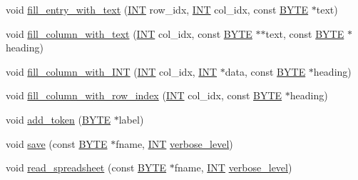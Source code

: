 \begin{DoxyCompactItemize}
\item 
void \mbox{\hyperlink{classspreadsheet_a566b10f622f02ea407a41f00942d9d03}{fill\+\_\+entry\+\_\+with\+\_\+text}} (\mbox{\hyperlink{galois_8h_a09fddde158a3a20bd2dcadb609de11dc}{I\+NT}} row\+\_\+idx, \mbox{\hyperlink{galois_8h_a09fddde158a3a20bd2dcadb609de11dc}{I\+NT}} col\+\_\+idx, const \mbox{\hyperlink{galois_8h_ab6cc7b4aeb6ea31aba2b3fbfc83ff5e6}{B\+Y\+TE}} $\ast$text)
\item 
void \mbox{\hyperlink{classspreadsheet_a7b49e3dfb10f5cdd57bacd4d21a60e3c}{fill\+\_\+column\+\_\+with\+\_\+text}} (\mbox{\hyperlink{galois_8h_a09fddde158a3a20bd2dcadb609de11dc}{I\+NT}} col\+\_\+idx, const \mbox{\hyperlink{galois_8h_ab6cc7b4aeb6ea31aba2b3fbfc83ff5e6}{B\+Y\+TE}} $\ast$$\ast$text, const \mbox{\hyperlink{galois_8h_ab6cc7b4aeb6ea31aba2b3fbfc83ff5e6}{B\+Y\+TE}} $\ast$heading)
\item 
void \mbox{\hyperlink{classspreadsheet_aab09e262f663de456c6a1ff9fc2b977c}{fill\+\_\+column\+\_\+with\+\_\+\+I\+NT}} (\mbox{\hyperlink{galois_8h_a09fddde158a3a20bd2dcadb609de11dc}{I\+NT}} col\+\_\+idx, \mbox{\hyperlink{galois_8h_a09fddde158a3a20bd2dcadb609de11dc}{I\+NT}} $\ast$data, const \mbox{\hyperlink{galois_8h_ab6cc7b4aeb6ea31aba2b3fbfc83ff5e6}{B\+Y\+TE}} $\ast$heading)
\item 
void \mbox{\hyperlink{classspreadsheet_a24ffe3a895380385eb9d60c1a4389157}{fill\+\_\+column\+\_\+with\+\_\+row\+\_\+index}} (\mbox{\hyperlink{galois_8h_a09fddde158a3a20bd2dcadb609de11dc}{I\+NT}} col\+\_\+idx, const \mbox{\hyperlink{galois_8h_ab6cc7b4aeb6ea31aba2b3fbfc83ff5e6}{B\+Y\+TE}} $\ast$heading)
\item 
void \mbox{\hyperlink{classspreadsheet_afa02f0e15b3053c03b22e131bb9982fe}{add\+\_\+token}} (\mbox{\hyperlink{galois_8h_ab6cc7b4aeb6ea31aba2b3fbfc83ff5e6}{B\+Y\+TE}} $\ast$label)
\item 
void \mbox{\hyperlink{classspreadsheet_ac8744dac17eef1474584aae9551927f6}{save}} (const \mbox{\hyperlink{galois_8h_ab6cc7b4aeb6ea31aba2b3fbfc83ff5e6}{B\+Y\+TE}} $\ast$fname, \mbox{\hyperlink{galois_8h_a09fddde158a3a20bd2dcadb609de11dc}{I\+NT}} \mbox{\hyperlink{simeon_8_c_a818073fbcc2f439e7c56952f67386122}{verbose\+\_\+level}})
\item 
void \mbox{\hyperlink{classspreadsheet_a83fe5093941eaa79509b66a7f235d6aa}{read\+\_\+spreadsheet}} (const \mbox{\hyperlink{galois_8h_ab6cc7b4aeb6ea31aba2b3fbfc83ff5e6}{B\+Y\+TE}} $\ast$fname, \mbox{\hyperlink{galois_8h_a09fddde158a3a20bd2dcadb609de11dc}{I\+NT}} \mbox{\hyperlink{simeon_8_c_a818073fbcc2f439e7c56952f67386122}{verbose\+\_\+level}})
$$
\end{DoxyCompactItemize}
